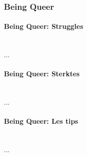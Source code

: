             \subsubsection{Being Queer}
            
                \paragraph{Being Queer: Struggles}\\
                    ...
                
                \bigskip
                \noindent\paragraph{Being Queer: Sterktes}\\
                    ... 
                    
                \bigskip
                \noindent\paragraph{Being Queer: Les tips}\\
                    ...

